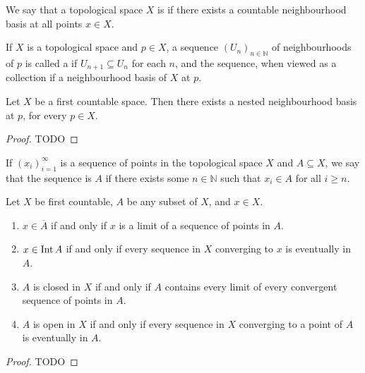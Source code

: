 \begin{definition}
	We say that a topological space $ X $ is  if there exists a countable neighbourhood basis at all points $ x \in X $.
\end{definition}

\begin{definition}
	If $ X $ is a topological space and $ p \in X $, a sequence $ ( U_{n} )_{n \in \mathbb{N}} $ of neighbourhoods of $ p $ is called a  if $ U_{n+1}\subseteq U_{n} $ for each $ n $, and the sequence, when viewed as a collection if a neighbourhood basis of $ X $ at $ p $.
\end{definition}

\begin{lemma}
	Let $ X $ be a first countable space. Then there exists a nested neighbourhood basis at $ p $, for every $ p \in X $.
	\begin{proof}
		TODO
	\end{proof}
\end{lemma}

\begin{definition}[Eventually in]
	If $ ( x_{i} )_{i=1}^{\infty} $ is a sequence of points in the topological space $ X $ and $ A \subseteq X $, we say that the sequence is  $ A $ if there exists some $ n \in \mathbb{N} $ such that $ x_{i} \in A $ for all $ i \geq n $.
\end{definition}

\begin{lemma}
	Let $ X $ be first countable, $ A $ be any subset of $ X $, and $ x \in X $.
	\begin{enumerate}
		\item $ x \in \overline{A} $ if and only if $ x $ is a limit of a sequence of points in $ A $.
		\item $ x \in \operatorname{Int}{A} $ if and only if every sequence in $ X $ converging to $ x $ is eventually in $ A $.
		\item $ A $ is closed in $ X $ if and only if $ A $ contains every limit of every convergent sequence of points in $ A $.
		\item $ A $ is open in $ X $ if and only if every sequence in $ X $ converging to a point of $ A $ is eventually in $ A $.
	\end{enumerate}
	\begin{proof}
		TODO
	\end{proof}
\end{lemma}

